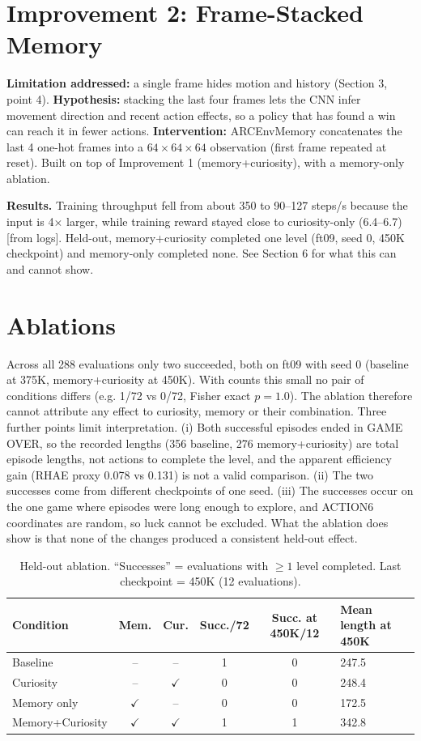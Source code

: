 \documentclass[11pt,a4paper]{article}
\begin{document}
\section{Improvement 2: Frame-Stacked Memory}

\textbf{Limitation addressed:} a single frame hides motion and history (Section 3, point 4). \textbf{Hypothesis:} stacking the last four frames lets the CNN infer movement direction and recent action effects, so a policy that has found a win can reach it in fewer actions. \textbf{Intervention:} ARCEnvMemory concatenates the last 4 one-hot frames into a $64\times64\times64$ observation (first frame repeated at reset). Built on top of Improvement 1 (memory+curiosity), with a memory-only ablation.

\textbf{Results.} Training throughput fell from about 350 to 90--127 steps/s because the input is 4$\times$ larger, while training reward stayed close to curiosity-only (6.4--6.7) [from logs]. Held-out, memory+curiosity completed one level (ft09, seed 0, 450K checkpoint) and memory-only completed none. See Section 6 for what this can and cannot show.

\section{Ablations}

Across all 288 evaluations only two succeeded, both on ft09 with seed 0 (baseline at 375K, memory+curiosity at 450K). With counts this small no pair of conditions differs (e.g. 1/72 vs 0/72, Fisher exact $p=1.0$). The ablation therefore cannot attribute any effect to curiosity, memory or their combination. Three further points limit interpretation. (i) Both successful episodes ended in GAME OVER, so the recorded lengths (356 baseline, 276 memory+curiosity) are total episode lengths, not actions to complete the level, and the apparent efficiency gain (RHAE proxy 0.078 vs 0.131) is not a valid comparison. (ii) The two successes come from different checkpoints of one seed. (iii) The successes occur on the one game where episodes were long enough to explore, and ACTION6 coordinates are random, so luck cannot be excluded. What the ablation does show is that none of the changes produced a consistent held-out effect.

\begin{table}[H]
\centering
\caption{Held-out ablation. ``Successes'' = evaluations with $\geq1$ level completed. Last checkpoint = 450K (12 evaluations).}
\label{tab:ablation}
\small
\begin{tabularx}{\linewidth}{@{}l c c c c Y@{}}
\toprule
\textbf{Condition} & \textbf{Mem.} & \textbf{Cur.} & \textbf{Succ./72} & \textbf{Succ. at 450K/12} & \textbf{Mean length at 450K} \\
\midrule
Baseline & -- & -- & 1 & 0 & 247.5 \\
Curiosity & -- & $\checkmark$ & 0 & 0 & 248.4 \\
Memory only & $\checkmark$ & -- & 0 & 0 & 172.5 \\
Memory+Curiosity & $\checkmark$ & $\checkmark$ & 1 & 1 & 342.8 \\
\bottomrule
\end{tabularx}
\end{table}
\end{document}
